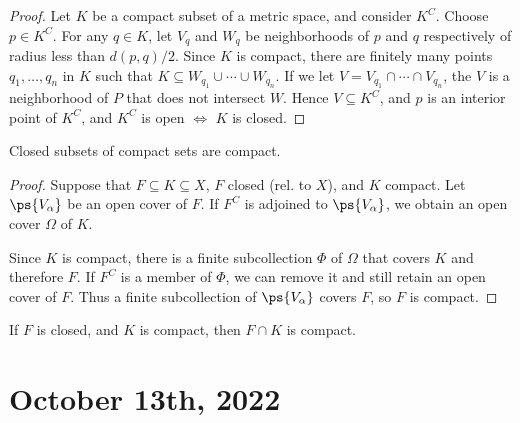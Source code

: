 \documentclass[11pt]{scrartcl}
\numberwithin{equation}{section}
\begin{document}
\begin{proof}
    Let $K$ be a compact subset of a metric space, and consider 
    $K^C$. Choose $p\in K^C$. For any $q\in K$, let $V_q$ and $W_q$ be 
    neighborhoods of $p$ and $q$ respectively of radius less than 
    $d(p,q)/2$.
    Since $K$ is compact, there are finitely many 
    points $q_1,\dots,q_n$ in $K$ such that $ K\subseteq W_{q_1}\cup \cdots\cup W_{q_n}$.
    If we let $V = V_{q_1}\cap \cdots\cap V_{q_n}$, the $V$ is a neighborhood of $P$ that does not intersect $W$.
    Hence $V\subseteq K^C$, and $p$ is an interior point of $K^C$,
    and $K^C$ is open $\iff$ $K$ is closed.
\end{proof}

\begin{theorem}
    Closed subsets of compact sets are compact.
\end{theorem}

\begin{proof}
    Suppose that $F\subseteq K\subseteq X$, $F$ closed (rel. to $X$),
    and $K$ compact. Let $\ps{V_\alpha}$ be an open cover of $F$.
    If $F^C$ is adjoined to $\ps{V_\alpha}$, we obtain an open cover 
    $\Omega$ of $K$.

    Since $K$ is compact, there is a finite subcollection $\Phi$ of 
    $\Omega$ that covers $K$ and therefore $F$. If $F^C$ is a 
    member of $\Phi$, we can remove it and still retain an 
    open cover of $F$. Thus a finite subcollection of $\ps{V_\alpha}$
    covers $F$, so $F$ is compact.
\end{proof}
\begin{corollary}
    If $F$ is closed, and $K$ is compact, then $F\cap K$ is compact.
\end{corollary}
\clearpage
\section{October 13th, 2022}
\end{document}
